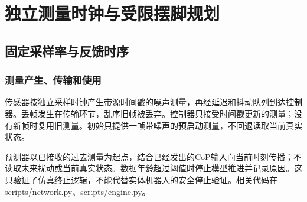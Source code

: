 


\FloatBarrier

\section{独立测量时钟与受限摆脚规划}

\label{stage:s20}

\subsection{固定采样率与反馈时序}\label{s20-detail-1}

\subsubsection{测量产生、传输和使用}\label{s20-detail-2}

传感器按独立采样时钟产生带源时间戳的噪声测量，再经延迟和抖动队列到达控制器。丢帧发生在传输环节，乱序旧帧被丢弃。控制器只接受时间戳更新的测量；没有新帧时复用旧测量。初始只提供一帧带噪声的预启动测量，不回退读取当前真实状态。

预测器以已接收的过去测量为起点，结合已经发出的CoP输入向当前时刻传播；不读取未来扰动或当前真实状态。数据年龄超过阈值时停止模型推进并记录原因。这只验证了仿真终止逻辑，不能代替实体机器人的安全停止验证。相关代码在 scripts/network.py、scripts/engine.py。

